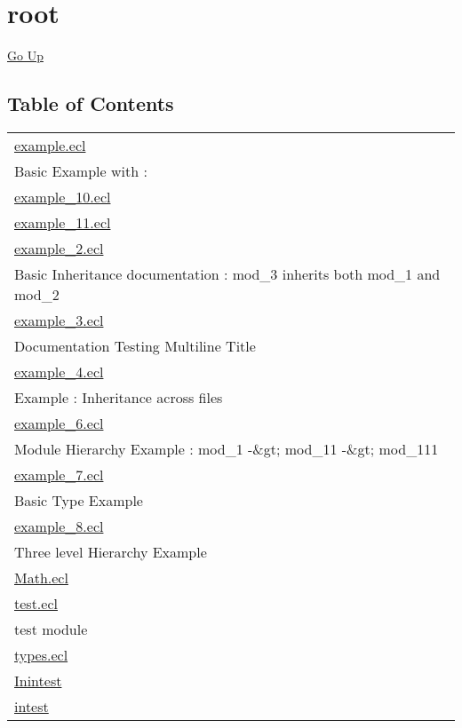 \chapter*{\color{headtoc} root}
\hypertarget{ecldoc:toc:root}{}
\hyperlink{ecldoc:toc:}{Go Up}


\section*{Table of Contents}
{\renewcommand{\arraystretch}{1.5}
\begin{longtable}{|p{\textwidth}|}
\hline
\hyperlink{ecldoc:toc:example}{example.ecl} \\
Basic Example with : \\
\hline
\hyperlink{ecldoc:toc:example_10}{example\_10.ecl} \\
\hline
\hyperlink{ecldoc:toc:example_11}{example\_11.ecl} \\
\hline
\hyperlink{ecldoc:toc:example_2}{example\_2.ecl} \\
Basic Inheritance documentation : mod\_3 inherits both mod\_1 and mod\_2 \\
\hline
\hyperlink{ecldoc:toc:example_3}{example\_3.ecl} \\
Documentation Testing Multiline Title \\
\hline
\hyperlink{ecldoc:toc:example_4}{example\_4.ecl} \\
Example : Inheritance across files \\
\hline
\hyperlink{ecldoc:toc:example_6}{example\_6.ecl} \\
Module Hierarchy Example : mod\_1 -\&gt; mod\_11 -\&gt; mod\_111 \\
\hline
\hyperlink{ecldoc:toc:example_7}{example\_7.ecl} \\
Basic Type Example \\
\hline
\hyperlink{ecldoc:toc:example_8}{example\_8.ecl} \\
Three level Hierarchy Example \\
\hline
\hyperlink{ecldoc:toc:Math}{Math.ecl} \\
\hline
\hyperlink{ecldoc:toc:test}{test.ecl} \\
test module \\
\hline
\hyperlink{ecldoc:toc:types}{types.ecl} \\
\hline
\hyperlink{ecldoc:toc:root/Inintest}{Inintest} \\
\hline
\hyperlink{ecldoc:toc:root/intest}{intest} \\
\hline
\end{longtable}
}















